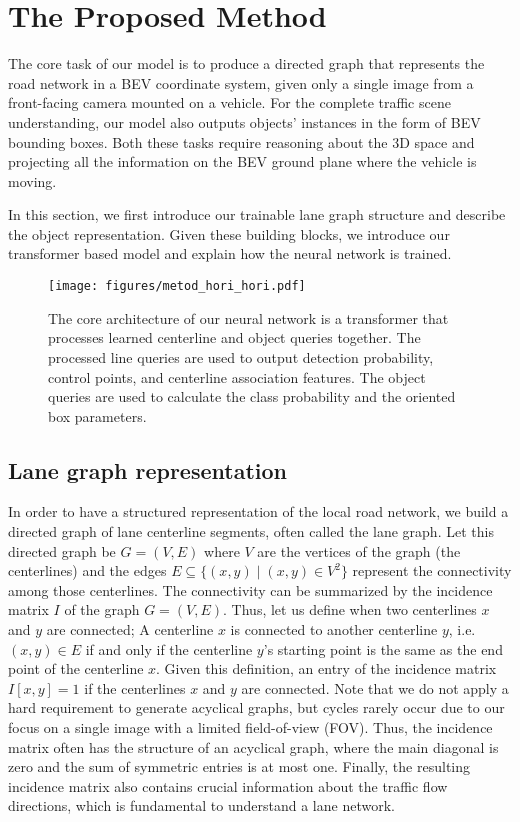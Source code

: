 \documentclass[10pt,twocolumn,letterpaper]{article}
\begin{document}
\section{The Proposed Method}
The core task of our model is to produce a directed graph that represents the road network in a BEV coordinate system, given only a single image from a front-facing camera mounted on a vehicle. For the complete traffic scene understanding, our model also outputs  objects' instances in the form of BEV bounding boxes. Both these tasks require reasoning about the 3D space and projecting all the information on the BEV ground plane where the vehicle is moving.

In this section, we first introduce our trainable lane graph structure and describe the object representation. Given these building blocks, we introduce our transformer based model and explain how the neural network is trained. 










\begin{figure*}
    \centering
    \texttt{[image: figures/metod\_hori\_hori.pdf]}
    \caption{The core architecture of our neural network is a transformer \cite{DBLP:conf/eccv/CarionMSUKZ20} that processes learned centerline and object queries together. The processed line queries are used to output detection probability, control points, and centerline association features. The object queries are used to calculate the class probability and the oriented box parameters.}
    \label{fig:temp_net}
    \vspace{-1em}
\end{figure*}

\subsection{Lane graph representation}
In order to have a structured representation of the local road network, we build a directed graph of lane centerline segments, often called the lane graph. Let this directed graph be $G = (V, E)$ where $V$ are the vertices of the graph (the centerlines) and the edges $E \subseteq \{(x,y)\; |\; (x,y) \in V^2\}$ represent the connectivity among those centerlines. The connectivity can be summarized by the incidence matrix $I$ of the graph $G = (V, E)$. Thus, let us define when two centerlines $x$ and $y$ are connected; A centerline $x$ is connected to another centerline $y$, i.e. $(x,y) \in E$ if and only if the centerline $y$'s starting point is the same as the end point of the centerline $x$. Given this definition, an entry of the incidence matrix $I[x,y] = 1$ if the centerlines $x$ and $y$ are connected. Note that we do not apply a hard requirement to generate acyclical graphs, but cycles rarely occur due to our focus on a single image with a limited field-of-view (FOV). Thus, the incidence matrix often has the structure of an acyclical graph, where the main diagonal is zero and the sum of symmetric entries is at most one. Finally, the resulting incidence matrix also contains crucial information about the traffic flow directions, which is fundamental to understand a lane network.
\end{document}
